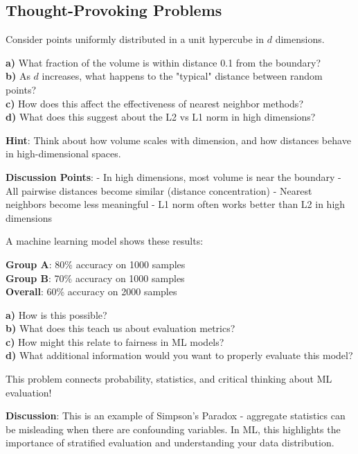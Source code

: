 \documentclass{article}
\newcounter{example}
\newcounter{exercise}
\begin{document}
\subsection{Thought-Provoking Problems}

\begin{tcolorbox}[colback=gray!5!white,colframe=gray!75!black,title=Problem \stepcounter{exercise}\#\theexercise: The Curse of Dimensionality]
Consider points uniformly distributed in a unit hypercube in $d$ dimensions.

\textbf{a)} What fraction of the volume is within distance 0.1 from the boundary?\\
\textbf{b)} As $d$ increases, what happens to the "typical" distance between random points?\\
\textbf{c)} How does this affect the effectiveness of nearest neighbor methods?\\
\textbf{d)} What does this suggest about the L2 vs L1 norm in high dimensions?

\textbf{Hint}: Think about how volume scales with dimension, and how distances behave in high-dimensional spaces.

\textbf{Discussion Points}:
- In high dimensions, most volume is near the boundary
- All pairwise distances become similar (distance concentration)
- Nearest neighbors become less meaningful
- L1 norm often works better than L2 in high dimensions
\end{tcolorbox}

\begin{tcolorbox}[colback=gray!5!white,colframe=gray!75!black,title=Problem \stepcounter{exercise}\#\theexercise: Simpson's Paradox in ML]
A machine learning model shows these results:

\textbf{Group A}: 80\% accuracy on 1000 samples\\
\textbf{Group B}: 70\% accuracy on 1000 samples\\
\textbf{Overall}: 60\% accuracy on 2000 samples

\textbf{a)} How is this possible?\\
\textbf{b)} What does this teach us about evaluation metrics?\\
\textbf{c)} How might this relate to fairness in ML models?\\
\textbf{d)} What additional information would you want to properly evaluate this model?

This problem connects probability, statistics, and critical thinking about ML evaluation!

\textbf{Discussion}:
This is an example of Simpson's Paradox - aggregate statistics can be misleading when there are confounding variables. In ML, this highlights the importance of stratified evaluation and understanding your data distribution.
\end{tcolorbox}
\end{document}
